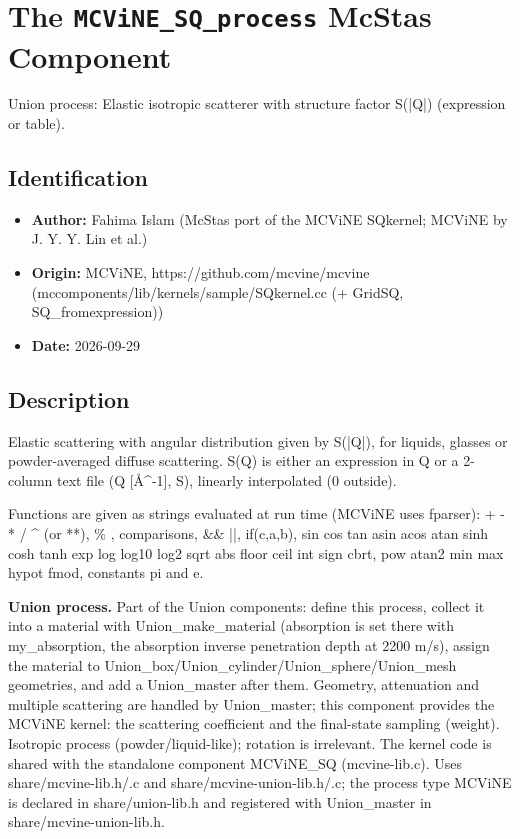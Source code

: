 \section{The \texttt{MCViNE\_SQ\_process} McStas Component}
Union process: Elastic isotropic scatterer with structure factor S(|Q|) (expression or table).

\subsection*{Identification}
\begin{itemize}
  \item \textbf{Author:} Fahima Islam (McStas port of the MCViNE SQkernel; MCViNE by J. Y. Y. Lin et al.)
  \item \textbf{Origin:} MCViNE, https://github.com/mcvine/mcvine (mccomponents/lib/kernels/sample/SQkernel.cc (+ GridSQ, SQ\_fromexpression))
  \item \textbf{Date:} 2026-09-29
\end{itemize}

\subsection*{Description}
Elastic scattering with angular distribution given by S(|Q|), for liquids, glasses or powder-averaged diffuse scattering. S(Q) is either an expression in Q or a 2-column text file (Q [\AA{}\textasciicircum{}-1], S), linearly interpolated (0 outside).

Functions are given as strings evaluated at run time (MCViNE uses fparser): + - * / \textasciicircum{} (or **), \% , comparisons, \&\& ||, if(c,a,b), sin cos tan asin acos atan sinh cosh tanh exp log log10 log2 sqrt abs floor ceil int sign cbrt, pow atan2 min max hypot fmod, constants pi and e.

\textbf{Union process.} Part of the Union components: define this process, collect it into a material with Union\_make\_material (absorption is set there with my\_absorption, the absorption inverse penetration depth at 2200 m/s), assign the material to Union\_box/Union\_cylinder/Union\_sphere/Union\_mesh geometries, and add a Union\_master after them. Geometry, attenuation and multiple scattering are handled by Union\_master; this component provides the MCViNE kernel: the scattering coefficient and the final-state sampling (weight). Isotropic process (powder/liquid-like); rotation is irrelevant. The kernel code is shared with the standalone component MCViNE\_SQ (mcvine-lib.c). Uses share/mcvine-lib.h/.c and share/mcvine-union-lib.h/.c; the process type MCViNE is declared in share/union-lib.h and registered with Union\_master in share/mcvine-union-lib.h.


